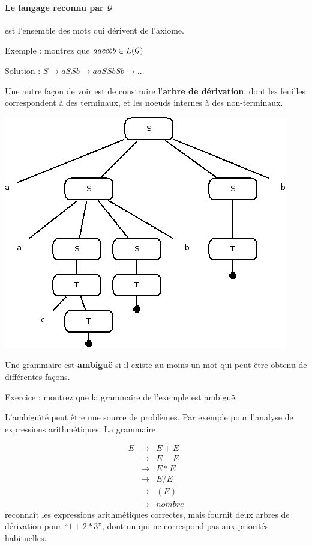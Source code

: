 \documentclass[10pt,twoside]{article}
\begin{document}
\paragraph{Le langage reconnu par $\cal G$} 
est l'ensemble des mots qui
 dérivent de l'axiome. 
 
Exemple : montrez que  $aaccbb \in L(\cal{G})$ 

Solution : $S \rightarrow aSSb \rightarrow aaSSbSb \rightarrow \ldots$

Une autre façon de voir est de construire l'\textbf{arbre de dérivation}, dont
les feuilles correspondent à des terminaux, et les noeuds internes
à des non-terminaux.


\begin{center}
\includegraphics[width=0.7\linewidth]{../dia/derivation}
\end{center}

Une grammaire est \textbf{ambiguë} si il existe au moins un mot
qui peut être obtenu de différentes façons.

Exercice : montrez que la grammaire de l'exemple est ambiguë.

L'ambiguïté peut être une source de problèmes. Par exemple
pour l'analyse de expressions arithmétiques. La grammaire

$$\begin{array}{rcl}
E & \rightarrow &  E + E \\
 & \rightarrow &  E - E \\
 & \rightarrow &  E * E \\
 & \rightarrow &  E / E \\
 & \rightarrow &  ( E )  \\
 & \rightarrow & nombre
\end{array}
$$
reconnaît les expressions arithmétiques correctes, mais
fournit deux arbres de dérivation pour ``$1+2*3$'',
dont un qui ne correspond pas aux priorités habituelles.
\end{document}
